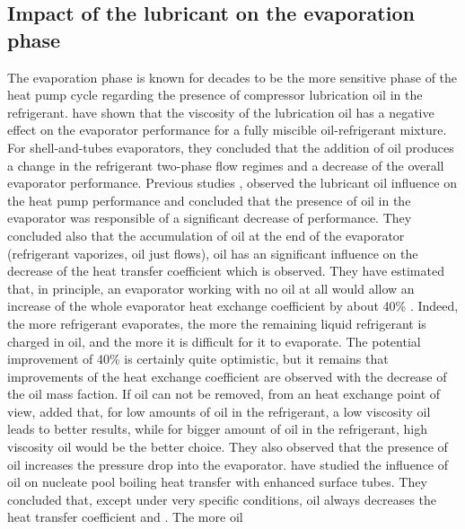 \subsection{Impact of the lubricant on the evaporation
  phase}
\label{sec:oil-ev}

The evaporation phase is known for decades to be the more sensitive
phase of the heat pump cycle regarding the presence of compressor
lubrication oil in the refrigerant. \citet{McMullan-Murphy-1992a} have
shown that the viscosity of the lubrication oil has a negative effect
on the evaporator performance for a fully miscible oil-refrigerant
mixture. For shell-and-tubes evaporators, they concluded that the
addition of oil produces a change in the refrigerant two-phase flow
regimes and a decrease of the overall evaporator performance. Previous
studies
\citep{McMullan-Hughes-1988b,McMullan-Hughes-1988a,Hughes-Morgan-1984a,Hughes-Morgan-1982a,Hughes-Sutcliffe-1980a,Hughes-Morgan-1984b},
observed the lubricant oil influence on the heat pump performance and
concluded that the presence of oil in the evaporator was responsible
of a significant decrease of performance. They concluded also that the
accumulation of oil at the end of the evaporator (refrigerant
vaporizes, oil just flows), oil has an significant influence on the
decrease of the heat transfer coefficient which is observed. They have
estimated that, in principle, an evaporator working with no oil at all
would allow an increase of the whole evaporator heat exchange
coefficient by about 40\%
\citep[p.\,123]{McMullan-Morgan-1983a}. Indeed, the more refrigerant
evaporates, the more the remaining liquid refrigerant is charged in
oil, and the more it is difficult for it to evaporate. The potential
improvement of 40\% is certainly quite optimistic, but it remains that
improvements of the heat exchange coefficient are observed with the
decrease of the oil mass faction. If oil can not be removed, from an
heat exchange point of view, \citet{McMullan-Morgan-1983a} added that,
for low amounts of oil in the refrigerant, a low viscosity oil leads
to better results, while for bigger amount of oil in the refrigerant,
high viscosity oil would be the better choice. They also observed that
the presence of oil increases the pressure drop into the
evaporator. \citet{Spindler-Hahne-2009a} have studied the influence of
oil on nucleate pool boiling heat transfer with enhanced surface
tubes. They concluded that, except under very specific conditions, oil
always decreases the heat transfer coefficient \citep[Fig.\,19
p.\,990]{Spindler-Hahne-2009a} and \citep{Moller-1998a}. The more oil
